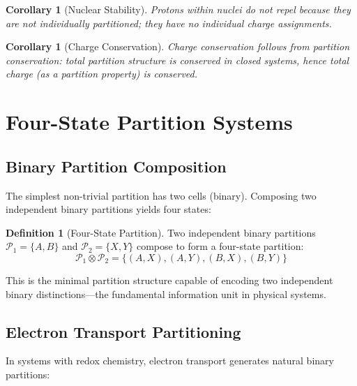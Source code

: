\documentclass[twocolumn,10pt,a4paper]{article}
\newtheorem{corollary}[theorem]{Corollary}
\theoremstyle{definition}
\newtheorem{definition}[theorem]{Definition}
\theoremstyle{remark}
\newcommand{\Partition}{\mathcal{P}}
\begin{document}
\begin{corollary}[Nuclear Stability]
\label{cor:nuclear}
Protons within nuclei do not repel because they are not individually partitioned; they have no individual charge assignments.
\end{corollary}

\begin{corollary}[Charge Conservation]
\label{cor:conservation}
Charge conservation follows from partition conservation: total partition structure is conserved in closed systems, hence total charge (as a partition property) is conserved.
\end{corollary}

\section{Four-State Partition Systems}
\label{sec:four_state}

\subsection{Binary Partition Composition}

The simplest non-trivial partition has two cells (binary). Composing two independent binary partitions yields four states:

\begin{definition}[Four-State Partition]
\label{def:four_state}
Two independent binary partitions $\Partition_1 = \{A, B\}$ and $\Partition_2 = \{X, Y\}$ compose to form a four-state partition:
\begin{equation}
    \Partition_1 \otimes \Partition_2 = \{(A,X), (A,Y), (B,X), (B,Y)\}
\end{equation}
\end{definition}

This is the minimal partition structure capable of encoding two independent binary distinctions---the fundamental information unit in physical systems.

\subsection{Electron Transport Partitioning}

In systems with redox chemistry, electron transport generates natural binary partitions:
\end{document}
